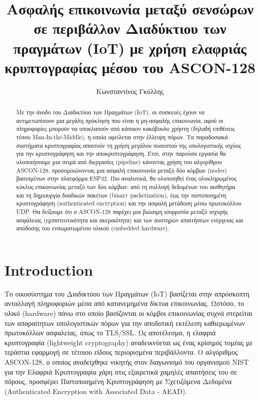 \documentclass[runningheads]{llncs}
\begin{document}
\title{Ασφαλής επικοινωνία μεταξύ σενσώρων σε περιβάλλον Διαδύκτιου των πραγμάτων (IoT) με χρήση ελαφριάς κρυπτογραφίας μέσου του ASCON-128}

\author{Κωνσταντίνος Γκύλλης} 



\maketitle

\begin{abstract}
Με την άνοδο του Διαδικτύου των Πραγμάτων (IoT), οι συσκευές έχουν να αντιμετωπίσουν μια μεγάλη πρόκληση που είναι η μη-ασφαλής επικοινωνία, 
αφού οι πληροφορίες μπορούν να υποκλαπούν από κάποιον κακόβουλο χρήστη (δηλαδή επιθέσεις τύπου Man-In-the-Middle), η οποία οφείλεται στην 
έλλειψη πόρων. Τα παραδοσιακά συστήματα κρυπτογραφίας απαιτούν τη χρήση μεγάλου ποσοστού της υπολογιστικής ισχύος για την κρυπτογράφηση 
και την αποκρυπτογράφηση. Έτσι, στην παρούσα εργασία θα υλοποιήσουμε μια σειρά από διεργασίες (pipeline) κάνοντας 
χρήση του αλγορίθμου ASCON-128, προσομοιώνοντας μια ασφαλή επικοινωνία μεταξύ δύο κόμβων (nodes) βασισμένων στην πλατφόρμα ESP32. 
Πιο αναλυτικά, θα υλοποιηθεί ένας ολοκληρωμένος κύκλος επικοινωνίας μεταξύ των δύο κόμβων: από τη συλλογή δεδομένων του αισθητήρα και τη δημιουργία δυαδικών πακέτων (binary packetization), 
έως την πιστοποιημένη κρυπτογράφηση (authenticated encryption) και την ασφαλή μετάδοση μέσω πρωτοκόλλου UDP. Θα δείξουμε ότι ο ASCON-128 παρέχει μια βιώσιμη ισορροπία μεταξύ 
ισχυρής ασφάλειας (εμπιστευτικότητα και ακεραιότητα) και των αυστηρών απαιτήσεων ενέργειας και απόδοσης του ενσωματωμένου υλικού (embedded hardware).

\end{abstract}

\section{Introduction}

Το οικοσύστημα του Διαδικτύου των Πραγμάτων (IoT) βασίζεται στην απρόσκοπτη ανταλλαγή πληροφοριών μέσα από κατανεμημένα δίκτυα επικοινωνίας. Ωστόσο, το υλικό (hardware) 
πάνω στο οποίο βασίζονται οι κόμβοι επικοινωνίας συχνά στερείται των απαραίτητων υπολογιστικών πόρων για την αποδοτική εκτέλεση καθιερωμένων πρωτοκόλλων ασφαλείας, όπως το TLS/SSL. 
Ως αποτέλεσμα, η ελαφριά κρυπτογραφία (lightweight cryptography) αναδεικνύεται ως ένας κρίσιμος τομέας με τεράστια εφαρμογή σε τέτοιου είδους περιορισμένα περιβάλλοντα.
Ο αλγόριθμος ASCON-128, ο οποίος αναδείχθηκε νικητής στον διαγωνισμό του οργανισμού NIST για την Ελαφριά Κρυπτογραφία χάρη στις εξαιρετικά χαμηλές απαιτήσεις του σε πόρους, 
προσφέρει Πιστοποιημένη Κρυπτογράφηση με Σχετιζόμενα Δεδομένα (Authenticated Encryption with Associated Data - AEAD). 
\end{document}
